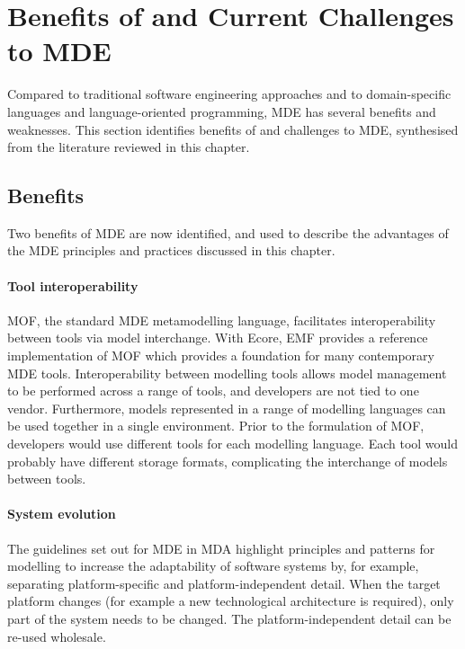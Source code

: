 
\section{Benefits of and Current Challenges to MDE}
\label{sec:mde_benefits_and_challenges}
Compared to traditional software engineering approaches and to domain-specific languages and language-oriented programming, MDE has several benefits and weaknesses. This section identifies benefits of and challenges to MDE, synthesised from the literature reviewed in this chapter.

\subsection{Benefits}
\label{subsec:mde_benefits}
Two benefits of MDE are now identified, and used to describe the advantages of the MDE principles and practices discussed in this chapter. 

\paragraph{Tool interoperability} MOF, the standard MDE metamodelling language, facilitates interoperability between tools via model interchange. With Ecore, EMF provides a reference implementation of MOF which provides a foundation for many contemporary MDE tools. Interoperability between modelling tools allows model management to be performed across a range of tools, and developers are not tied to one vendor. Furthermore, models represented in a range of modelling languages can be used together in a single environment. Prior to the formulation of MOF, developers would use different tools for each modelling language. Each tool would probably have different storage formats, complicating the interchange of models between tools.

\paragraph{System evolution} The guidelines set out for MDE in MDA \cite{mda} highlight principles and patterns for modelling to increase the adaptability of software systems by, for example, separating platform-specific and platform-independent detail. When the target platform changes (for example a new technological architecture is required), only part of the system needs to be changed. The platform-independent detail can be re-used wholesale. 

